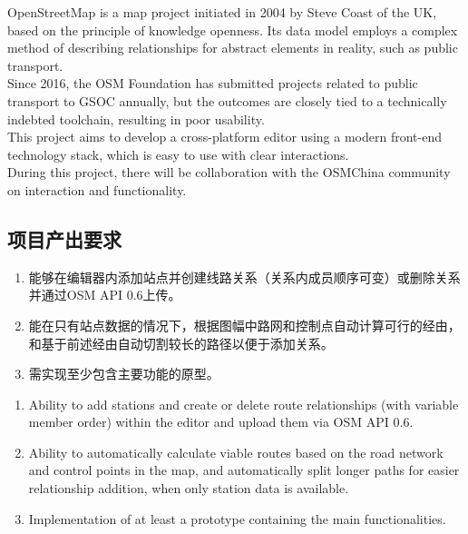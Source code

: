 \documentclass{beamer}
\begin{document}
\begin{frame}
    \quad \quad OpenStreetMap is a map project initiated in 2004 by Steve Coast of the UK, based on the principle of knowledge openness. 
    Its data model employs a complex method of describing relationships for abstract elements in reality, such as public transport. \\
    \quad \quad Since 2016, the OSM Foundation has submitted projects related to public transport to GSOC annually, 
    but the outcomes are closely tied to a technically indebted toolchain, resulting in poor usability. \\
    \quad \quad This project aims to develop a cross-platform editor using a modern front-end technology stack, which is easy to use with clear interactions. \\
    \quad \quad During this project, there will be collaboration with the OSMChina community on interaction and functionality.
\end{frame}

\subsection{项目产出要求}

\begin{frame}
    \begin{enumerate}
        \item 能够在编辑器内添加站点并创建线路关系（关系内成员顺序可变）或删除关系并通过OSM API 0.6上传。
        \item 能在只有站点数据的情况下，根据图幅中路网和控制点自动计算可行的经由，和基于前述经由自动切割较长的路径以便于添加关系。
        \item 需实现至少包含主要功能的原型。
    \end{enumerate}
\end{frame}

\begin{frame}
    \begin{enumerate}
        \item Ability to add stations and create or delete route relationships (with variable member order) within the editor and upload them via OSM API 0.6.
        \item Ability to automatically calculate viable routes based on the road network and control points in the map, and automatically split longer paths for easier relationship addition, when only station data is available.
        \item Implementation of at least a prototype containing the main functionalities.
    \end{enumerate}
\end{frame}
\end{document}
